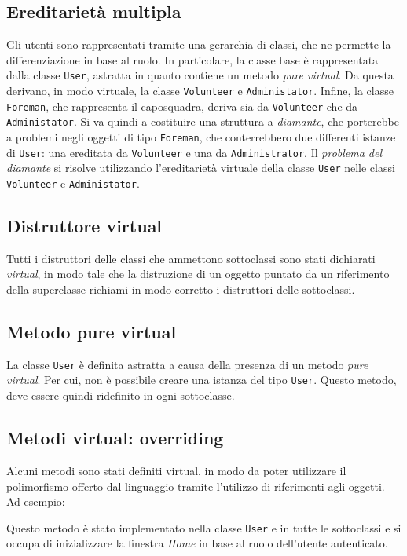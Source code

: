\subsection{Ereditarietà multipla}
Gli utenti sono rappresentati tramite una gerarchia di classi, che ne permette la differenziazione in base al ruolo. In particolare, la classe base è rappresentata dalla classe \texttt{User}, astratta in quanto contiene un metodo \textit{pure virtual}. Da questa derivano, in modo virtuale, la classe \texttt{Volunteer} e \texttt{Administator}. Infine, la classe \texttt{Foreman}, che rappresenta il caposquadra, deriva sia da \texttt{Volunteer} che da \texttt{Administator}. Si va quindi a costituire una struttura a \textit{diamante}, che porterebbe a problemi negli oggetti di tipo \texttt{Foreman}, che conterrebbero due differenti istanze di \texttt{User}: una ereditata da \texttt{Volunteer} e una da \texttt{Administrator}. Il \textit{problema del diamante} si risolve utilizzando l'ereditarietà virtuale della classe \texttt{User} nelle classi \texttt{Volunteer} e \texttt{Administator}.



\subsection{Distruttore virtual}
Tutti i distruttori delle classi che ammettono sottoclassi sono stati dichiarati \textit{virtual}, in modo tale che la distruzione di un oggetto puntato da un riferimento della superclasse richiami in modo corretto i distruttori delle sottoclassi.


\subsection{Metodo pure virtual}
La classe \texttt{User} è definita astratta a causa della presenza di un metodo \textit{pure virtual}. Per cui, non è possibile creare una istanza del tipo \texttt{User}. Questo metodo, deve essere quindi ridefinito in ogni sottoclasse.


\subsection{Metodi virtual: overriding}
Alcuni metodi sono stati definiti virtual, in modo da poter utilizzare il polimorfismo offerto dal linguaggio tramite l'utilizzo di riferimenti agli oggetti. Ad esempio:

Questo metodo è stato implementato nella classe \texttt{User} e in tutte le sottoclassi e si occupa di inizializzare la finestra \textit{Home} in base al ruolo dell'utente autenticato.

